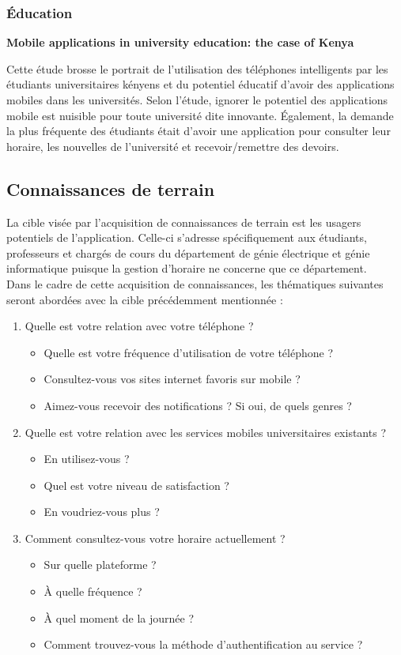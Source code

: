 		\subsubsection{Éducation}
		{\bfseries \cite{kenya} Mobile applications in university education: the case of Kenya}
		
		Cette étude brosse le portrait de l'utilisation des téléphones intelligents par les étudiants universitaires kényens et du potentiel éducatif d'avoir des applications mobiles dans les universités. Selon l'étude, ignorer le potentiel des applications mobile est nuisible pour toute université dite innovante. Également, la demande la plus fréquente des étudiants était d'avoir une application pour consulter leur horaire, les nouvelles de l'université et recevoir/remettre des devoirs.
	
	\subsection{Connaissances de terrain}
	La cible visée par l'acquisition de connaissances de terrain est les usagers potentiels de l'application. Celle-ci s'adresse spécifiquement aux étudiants, professeurs et chargés de cours du département de génie électrique et génie informatique puisque la gestion d'horaire ne concerne que ce département. \\
	
	Dans le cadre de cette acquisition de connaissances, les thématiques suivantes seront abordées avec la cible précédemment mentionnée :

	\begin{enumerate}
		\item Quelle est votre relation avec votre téléphone ?
		\begin{itemize}
			\item Quelle est votre fréquence d'utilisation de votre téléphone ?
			\item Consultez-vous vos sites internet favoris sur mobile ?
			\item Aimez-vous recevoir des notifications ? Si oui, de quels genres ?
		\end{itemize}
		\item Quelle est votre relation avec les services mobiles universitaires existants ?
		\begin{itemize}
			\item En utilisez-vous ?
			\item Quel est votre niveau de satisfaction ?
			\item En voudriez-vous plus ?
		\end{itemize}
		\item Comment consultez-vous votre horaire actuellement ?
		\begin{itemize}
			\item Sur quelle plateforme ?
			\item À quelle fréquence ?
			\item À quel moment de la journée ?
			\item Comment trouvez-vous la méthode d'authentification au service ?
		\end{itemize}
	\end{enumerate}
	
